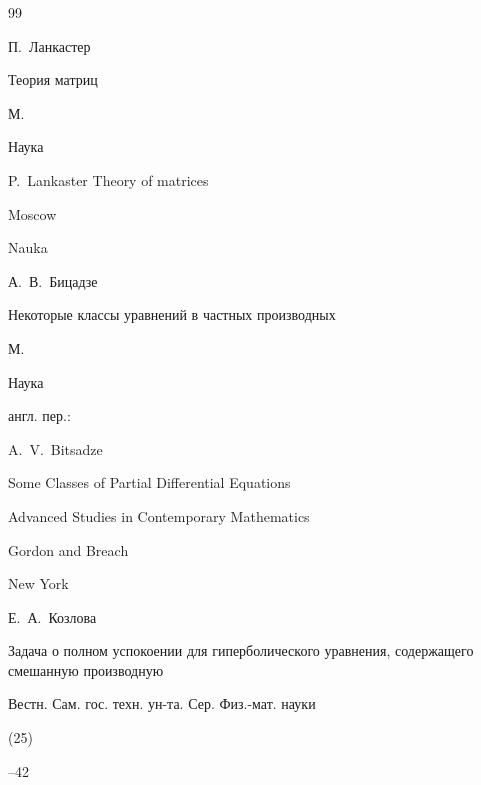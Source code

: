 \begin{thebibliography}{99}





\by П.~Ланкастер

\book Теория матриц

\publaddr М.

\publ Наука



\misctransl

\by P.~Lankaster \book Theory of matrices

\publaddr Moscow

\publ Nauka








\by А.~В.~Бицадзе

\book Некоторые классы уравнений в частных производных

\publaddr М.

\publ Наука



\transl англ. пер.:~

\by A.~V.~Bitsadze

\book Some Classes of Partial Differential Equations

\serial Advanced Studies in Contemporary Mathematics


\publ Gordon and Breach

\publaddr New York








\by Е.~А.~Козлова

\paper Задача о полном успокоении для гиперболического уравнения, содержащего смешанную производную

\jour Вестн. Сам. гос. техн. ун-та. Сер. Физ.-мат. науки


(25)

--42


\end{thebibliography}

